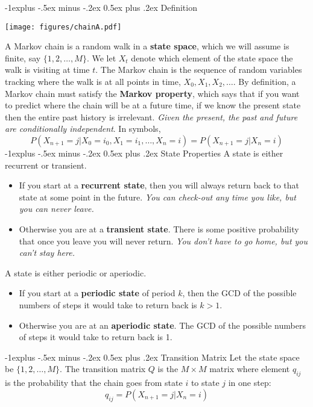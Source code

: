 \documentclass[10pt,landscape]{article}
\makeatletter
\renewcommand{\subsection}{\@startsection{subsection}{2}{0mm}%
                                {-1explus -.5ex minus -.2ex}%
                                {0.5ex plus .2ex}%
                                {\normalfont\normalsize\bfseries}}
\makeatother
\begin{document}
\begin{multicols*}{3}
\subsection{Definition}
\begin{minipage}{\linewidth}
            \centering
\texttt{[image: figures/chainA.pdf]}
        \end{minipage}
A Markov chain is a random walk in a \textbf{state space}, which we will assume is finite, say $\{1, 2, \dots, M\}$. We let $X_t$ denote which element of the state space the walk is visiting at time $t$. The Markov chain is the sequence of random variables tracking where the walk is at all points in time, $X_0, X_1, X_2, \dots$. By definition, a Markov chain must satisfy the \textbf{Markov property}, which says that if you want to predict where the chain will be at a future time, if we know the present state then the entire past history is irrelevant.  \emph{Given the present, the past and future are conditionally independent}. In symbols,
\[P(X_{n+1} = j | X_0 = i_0, X_1 = i_1, \dots, X_n = i) = P(X_{n+1} = j | X_n = i)\]
\subsection{State Properties}
A state is either recurrent or transient.
\begin{itemize}
\item If you start at a \textbf{recurrent state}, then you will always return back to that state at some point in the future.  \textmusicalnote \emph{You can check-out any time you like, but you can never leave.}  \textmusicalnote
\item Otherwise you are at a \textbf{transient state}. There is some positive probability that once you leave you will never return. \textmusicalnote \emph{You don't have to go home, but you can't stay here.} \textmusicalnote
\end{itemize}
A state is either periodic or aperiodic.
\begin{itemize}
\item If you start at a \textbf{periodic state} of period $k$, then the GCD of  the possible numbers of steps it would take to return back is  $k>1$.
\item Otherwise you are at an \textbf{aperiodic state}. The GCD of  the possible numbers of steps it would take to return back is 1.
\end{itemize}


\subsection{Transition Matrix}
Let the state space be $\{1,2,\dots,M\}$. The transition matrix $Q$ is the $M \times M$ matrix where element $q_{ij}$ is the probability that the chain goes from state $i$ to state $j$ in one step:
\[q_{ij} = P(X_{n+1} = j | X_n = i)\]


\end{multicols*}
\end{document}
